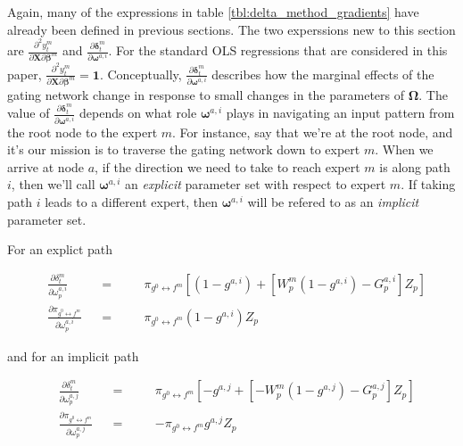 \documentclass[12pt]{article}
\newcommand{\gateprod}[2]{\pi_{#1 \longleftrightarrow #2}}
\begin{document}
Again, many of the expressions in table \ref{tbl:delta_method_gradients}
have already been defined in previous sections. The two experssions new to this
section are $\frac{\partial^{2} y^{m}_{t}}{\partial \boldsymbol{X} \partial \boldsymbol{\beta}^{m}}$
and  $\frac{\partial \boldsymbol{\delta}^{m}_{t}}{\partial \boldsymbol{\omega}^{a,i}}$.
For the standard OLS regressions that are considered in this paper,
$\frac{\partial^{2} y^{m}_{t}}{\partial \boldsymbol{X} \partial \boldsymbol{\beta}^{m}} = \boldsymbol{1}$.
Conceptually, $\frac{\partial \boldsymbol{\delta}^{m}_{t}}{\partial \boldsymbol{\omega}^{a,i}}$
describes how the marginal effects of the gating network change in response
to small changes in the parameters of $\boldsymbol{\Omega}$. The value of
$\frac{\partial \boldsymbol{\delta}^{m}_{t}}{\partial \boldsymbol{\omega}^{a,i}}$
depends on what role $\boldsymbol{\omega}^{a,i}$ plays in navigating an input
pattern from the root node to the expert $m$. For instance, say that we're
at the root node, and it's our mission is to traverse the gating network down
to expert $m$. When we arrive at node $a$, if the direction we need to take to
reach expert $m$ is along path $i$, then we'll call $\boldsymbol{\omega}^{a,i}$
an \textit{explicit} parameter set with respect to expert $m$. If taking path $i$ leads to a different expert,
then $\boldsymbol{\omega}^{a,i}$ will be refered to as an \textit{implicit}
parameter set.

For an explict path

\begin{subequations} \label{eq:delta_definitions_exp}
  \begin{alignat}{3}
  &\frac{\partial \delta^{m}_{t}}{\partial \omega^{a,i}_{p}}            &&=&\quad& \gateprod{g^{0}}{f^{m}} \left[ (1 - g^{a,i})  +  \left[ W^{m}_{p}  (1 - g^{a,i}) - G^{a,i}_{p}  \right] Z_{p} \right] \label{eq:delta_gate_partial_exp}  \\
  &\frac{\partial \gateprod{g^{0}}{f^{m}}}{\partial \omega^{a,i}_{p}}   &&=&\quad& \gateprod{g^{0}}{f^{m}} (1 - g^{a,i}) Z_{p}
  \end{alignat}
  \end{subequations}

and for an implicit path

\begin{subequations} \label{eq:delta_definitions_imp}
\begin{alignat}{3}
&\frac{\partial \delta^{m}_{t}}{\partial \omega^{a,j}_{p}}            &&=&\quad& \gateprod{g^{0}}{f^{m}} \left[ - g^{a,j}  +  \left[ - W^{m}_{p}  (1 - g^{a,j}) - G^{a,j}_{p}  \right] Z_{p} \right] \label{eq:delta_gate_partial_imp}  \\
&\frac{\partial \gateprod{g^{0}}{f^{m}}}{\partial \omega^{a,j}_{p}}   &&=&\quad& - \gateprod{g^{0}}{f^{m}} g^{a,j} Z_{p}
\end{alignat}
\end{subequations}
\end{document}
